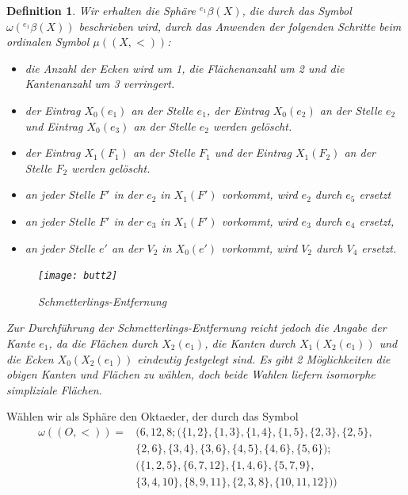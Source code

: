 \documentclass[12pt,titlepage,twoside,cleardoublepage]{article}
\theoremstyle{nummermitklammern}
\newtheorem{definition}[temp]{Definition}
\newtheorem{definition}[zahl]{Definition}
\numberwithin{equation}{section}
\begin{document}
\begin{definition}
Wir erhalten die Sphäre ${}^{e_1}\beta(X)$, die durch das Symbol $\omega({}^{e_1}\beta(X))$ beschrieben wird, durch das Anwenden der folgenden Schritte beim ordinalen Symbol $\mu((X,<))$: 
\begin{itemize}
\item die Anzahl der Ecken wird um 1, die Flächenanzahl um 2 und die Kantenanzahl um 3 verringert.
\item der Eintrag $X_0(e_1)$ an der Stelle $e_1$, der Eintrag $X_0(e_2)$ an der Stelle $e_2$ und Eintrag $X_0(e_3)$ an der Stelle $e_2$ werden gelöscht. 
\item der Eintrag $X_1(F_1)$ an der Stelle $F_1$ und der Eintrag $X_1(F_2)$ an der Stelle $F_2$ werden gelöscht. 
\
\item an jeder Stelle ${F}'$ in der $e_2$ in $X_1({F}')$ vorkommt, wird $e_2$ durch $e_5$ ersetzt
\item an jeder Stelle ${F}'$ in der $e_3$ in $X_1({F}')$ vorkommt, wird $e_3$ durch $e_4$ ersetzt,
\item an jeder Stelle ${e}'$ an der $V_2$ in $X_0({e}')$ vorkommt, wird $V_2$ durch $V_4$ ersetzt.
\end{itemize}
\begin{figure}[H]
\begin{center}
\texttt{[image: butt2]}
\end{center}
\caption{Schmetterlings-Entfernung}
\end{figure}
Zur Durchführung der Schmetterlings-Entfernung reicht jedoch die Angabe der Kante $e_1$, da die Flächen durch $X_2(e_1)$, die Kanten durch $X_1(X_2(e_1))$ und die Ecken $X_0(X_2(e_1))$ eindeutig festgelegt sind. Es gibt 2 Möglichkeiten die obigen Kanten und Flächen zu wählen, doch beide Wahlen liefern isomorphe simpliziale Flächen.
 \end{definition}

 Wählen wir als Sphäre den Oktaeder, der durch das Symbol
 \begin{align*}
 \omega((O,<))=&(6,12,8;(\{1,2\},\{1,3\},\{1,4\},\{1,5\},\{2,3\},\{2,5\},\\
 &\{2,6\},\{3,4\},\{3,6\},\{4,5\},\{4,6\},\{5,6\});\\
 &(\{1,2,5\},\{6,7,12\},\{1,4,6\},\{5,7,9\},\\&\{3,4,10\},\{8,9,11\},\{2,3,8\},\{10,11,12\}))
 \end{align*}
\end{document}
